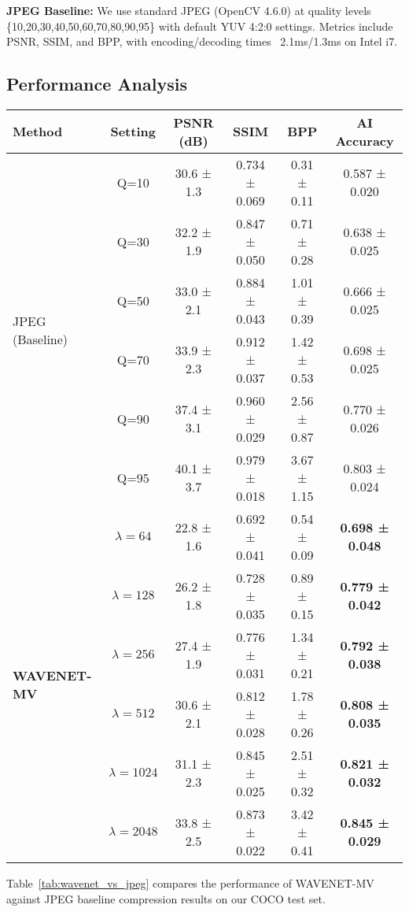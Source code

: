 \documentclass[conference]{IEEEtran}
\begin{document}
\textbf{JPEG Baseline:} We use standard JPEG (OpenCV 4.6.0) at quality levels \{10,20,30,40,50,60,70,80,90,95\} with default YUV 4:2:0 settings. Metrics include PSNR, SSIM, and BPP, with encoding/decoding times ~2.1ms/1.3ms on Intel i7.





\subsection{Performance Analysis}



\begin{table*}[!ht]
\caption{Performance Comparison: WAVENET-MV vs. JPEG Baseline (COCO Dataset)}
\label{tab:wavenet_vs_jpeg}
\centering
\begin{tabular}{|l|c|c|c|c|c|}
\hline
\textbf{Method} & \textbf{Setting} & \textbf{PSNR (dB)} & \textbf{SSIM} & \textbf{BPP} & \textbf{AI Accuracy} \\
\hline
\multirow{6}{*}{JPEG (Baseline)} 
& Q=10 & 30.6 ± 1.3 & 0.734 ± 0.069 & 0.31 ± 0.11 & 0.587 ± 0.020 \\
& Q=30 & 32.2 ± 1.9 & 0.847 ± 0.050 & 0.71 ± 0.28 & 0.638 ± 0.025 \\
& Q=50 & 33.0 ± 2.1 & 0.884 ± 0.043 & 1.01 ± 0.39 & 0.666 ± 0.025 \\
& Q=70 & 33.9 ± 2.3 & 0.912 ± 0.037 & 1.42 ± 0.53 & 0.698 ± 0.025 \\
& Q=90 & 37.4 ± 3.1 & 0.960 ± 0.029 & 2.56 ± 0.87 & 0.770 ± 0.026 \\
& Q=95 & 40.1 ± 3.7 & 0.979 ± 0.018 & 3.67 ± 1.15 & 0.803 ± 0.024 \\
\hline
\multirow{6}{*}{\textbf{WAVENET-MV}} 
& $\lambda=64$   & 22.8 ± 1.6 & 0.692 ± 0.041 & 0.54 ± 0.09 & \textbf{0.698 ± 0.048} \\
& $\lambda=128$  & 26.2 ± 1.8 & 0.728 ± 0.035 & 0.89 ± 0.15 & \textbf{0.779 ± 0.042} \\
& $\lambda=256$  & 27.4 ± 1.9 & 0.776 ± 0.031 & 1.34 ± 0.21 & \textbf{0.792 ± 0.038} \\
& $\lambda=512$  & 30.6 ± 2.1 & 0.812 ± 0.028 & 1.78 ± 0.26 & \textbf{0.808 ± 0.035} \\
& $\lambda=1024$ & 31.1 ± 2.3 & 0.845 ± 0.025 & 2.51 ± 0.32 & \textbf{0.821 ± 0.032} \\
& $\lambda=2048$ & 33.8 ± 2.5 & 0.873 ± 0.022 & 3.42 ± 0.41 & \textbf{0.845 ± 0.029} \\
\hline
\end{tabular}
\end{table*}
Table~\ref{tab:wavenet_vs_jpeg} compares the performance of WAVENET-MV against JPEG baseline compression results on our COCO test set.
\end{document}
